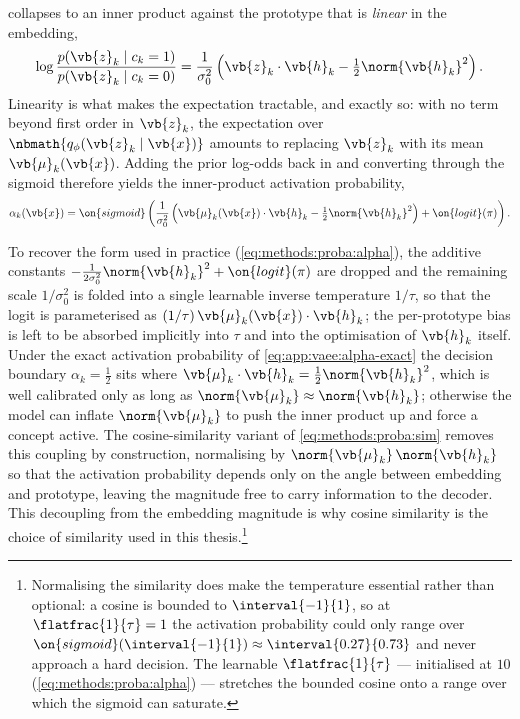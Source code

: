 collapses to an inner product against the prototype that is \textit{linear} in
the embedding,
\begin{equation*}
    \log \frac{p(\vb{z}_k \mid c_k = 1)}{p(\vb{z}_k \mid c_k = 0)} =
    \frac{1}{\sigma_0^2}\left(\vb{z}_k \cdot \vb{h}_k
    - \tfrac{1}{2}\norm{\vb{h}_k}^2\right).
\end{equation*}
Linearity is what makes the expectation tractable, and exactly so: with no term
beyond first order in $\vb{z}_k$, the expectation over $\nbmath{q_\phi(\vb{z}_k
\mid \vb{x})}$ amounts to replacing $\vb{z}_k$ with its mean
$\vb{\mu}_k(\vb{x})$. Adding the prior log-odds back in and converting through
the sigmoid therefore yields the inner-product activation probability,
\begin{equation} \label{eq:app:vaee:alpha-exact}
    \alpha_k(\vb{x}) = \on{sigmoid}\left(
    \frac{1}{\sigma_0^2}\left(\vb{\mu}_k(\vb{x}) \cdot \vb{h}_k
    - \tfrac{1}{2}\norm{\vb{h}_k}^2\right) + \on{logit}(\pi)
    \right).
\end{equation}

To recover the form used in practice
(\cref{eq:methods:proba:alpha}), the additive constants
$-\frac{1}{2\sigma_0^2}\norm{\vb{h}_k}^2 + \on{logit}(\pi)$ are dropped and the
remaining scale $1/\sigma_0^2$ is folded into a single learnable inverse
temperature $1/\tau$, so that the logit is parameterised as
$(1/\tau)\,\vb{\mu}_k(\vb{x}) \cdot \vb{h}_k$; the per-prototype bias is left to
be absorbed implicitly into $\tau$ and into the optimisation of $\vb{h}_k$
itself. Under the exact activation probability of \cref{eq:app:vaee:alpha-exact}
the decision boundary $\alpha_k = \tfrac{1}{2}$ sits where
$\vb{\mu}_k \cdot \vb{h}_k = \tfrac{1}{2}\norm{\vb{h}_k}^2$, which is well
calibrated only as long as $\norm{\vb{\mu}_k} \approx \norm{\vb{h}_k}$;
otherwise the model can inflate $\norm{\vb{\mu}_k}$ to push the inner product up
and force a concept active. The cosine-similarity variant of
\cref{eq:methods:proba:sim} removes this coupling by
construction, normalising by $\norm{\vb{\mu}_k}\,\norm{\vb{h}_k}$ so that the
activation probability depends only on the angle between embedding and prototype, leaving the
magnitude free to carry information to the decoder. This decoupling
from the embedding magnitude is why cosine similarity is the choice of
similarity used in this thesis.\footnote{Normalising the similarity does make
    the temperature essential rather than optional: a cosine is bounded to
    $\interval{-1}{1}$, so at $\flatfrac{1}{\tau} = 1$ the activation probability could only range
    over $\on{sigmoid}(\interval{-1}{1}) \approx \interval{0.27}{0.73}$ and
    never approach a hard decision. The learnable $\flatfrac{1}{\tau}$ ---
    initialised at $10$ (\cref{eq:methods:proba:alpha}) ---
    stretches the bounded cosine onto a range over which the sigmoid can
saturate.}

